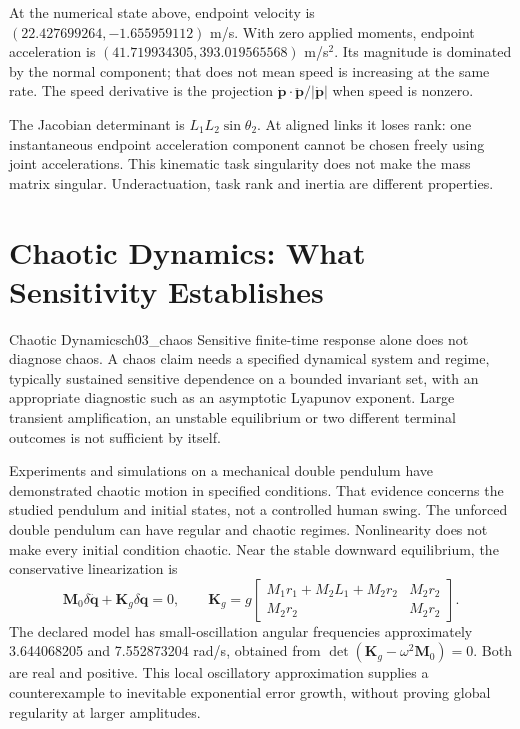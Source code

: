 At the numerical state above, endpoint velocity is $(22.427699264,-1.655959112)$ m/s. With zero applied moments, endpoint acceleration is $(41.719934305,393.019565568)$ m/s$^2$. Its magnitude is dominated by the normal component; that does not mean speed is increasing at the same rate. The speed derivative is the projection $\dot{\bm p}\cdot\ddot{\bm p}/|\dot{\bm p}|$ when speed is nonzero.

The Jacobian determinant is $L_1L_2\sin\theta_2$. At aligned links it loses rank: one instantaneous endpoint acceleration component cannot be chosen freely using joint accelerations. This kinematic task singularity does not make the mass matrix singular. Underactuation, task rank and inertia are different properties.

\section{Chaotic Dynamics: What Sensitivity Establishes}
\begin{definition}{Chaotic Dynamics}{ch03_chaos}
Sensitive finite-time response alone does not diagnose chaos. A chaos claim needs a specified dynamical system and regime, typically sustained sensitive dependence on a bounded invariant set, with an appropriate diagnostic such as an asymptotic Lyapunov exponent. Large transient amplification, an unstable equilibrium or two different terminal outcomes is not sufficient by itself.
\end{definition}
Experiments and simulations on a mechanical double pendulum have demonstrated chaotic motion in specified conditions. That evidence concerns the studied pendulum and initial states, not a controlled human swing. \citep{Shinbrot1992DoublePendulum} The unforced double pendulum can have regular and chaotic regimes. Nonlinearity does not make every initial condition chaotic. Near the stable downward equilibrium, the conservative linearization is
\[
\bm M_0\delta\ddot{\bm q}+\bm K_g\delta\bm q=0,\qquad
\bm K_g=g\begin{bmatrix}M_1r_1+M_2L_1+M_2r_2&M_2r_2\\M_2r_2&M_2r_2\end{bmatrix}.
\]
The declared model has small-oscillation angular frequencies approximately 3.644068205 and 7.552873204 rad/s, obtained from $\det(\bm K_g-\omega^2\bm M_0)=0$. Both are real and positive. This local oscillatory approximation supplies a counterexample to inevitable exponential error growth, without proving global regularity at larger amplitudes.

